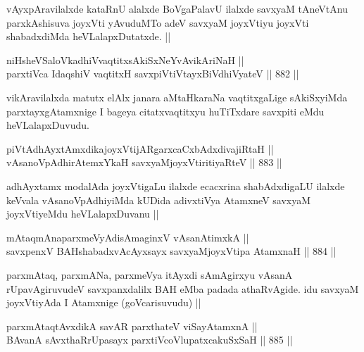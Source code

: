 \begin{artha}
vAyxpAravilalxde kataRnU alalxde BoVgaPalavU ilalxde savxyaM tAneVtAnu parxkAshisuva joyxVti yAvuduMTo adeV savxyaM joyxVtiyu joyxVti shabadxdiMda heVLalapxDutatxde. ||
\end{artha}


\begin{shl}
niHsheVSaloVkadhiVvaqtitxsAkiSxNeYvAvikAriNaH ||  \\
parxtiVca IdaqshiV vaqtitxH savxpiVtiVtayxBiVdhiVyateV ||  882 ||  
\end{shl}

\begin{artha}
vikAravilalxda matutx elAlx janara aMtaHkaraNa vaqtitxgaLige sAkiSxyiMda parxtayxgAtamxnige I bageya citatxvaqtitxyu huTiTxdare savxpiti eMdu heVLalapxDuvudu.
\end{artha}

\begin{shl}
piVtAdhAyxtAmxdikajoyxVtijARgarxcaCxbAdxdivajiRtaH || \\
vAsanoVpAdhirAtemxYkaH savxyaMjoyxVtiritiyaRteV ||  883 ||  
\end{shl}

\begin{artha}
adhAyxtamx modalAda joyxVtigaLu ilalxde ecacxrina shabAdxdigaLU ilalxde keVvala vAsanoVpAdhiyiMda kUDida adivxtiVya AtamxneV savxyaM joyxVtiyeMdu heVLalapxDuvanu ||
\end{artha}


\begin{shl}
mAtaqmAnaparxmeVyAdisAmaginxV vAsanAtimxkA || \\
savxpenxV BAHshabadxvAcAyx\s sayx savxyaMjoyxVtipa AtamxnaH ||  884 ||  
\end{shl}

\begin{artha}
parxmAtaq, parxmANa, parxmeVya itAyxdi sAmAgirxyu vAsanA rUpavAgiruvudeV savxpanxdalilx BAH eMba padada athaRvAgide. idu savxyaM joyxVtiyAda I Atamxnige (goVcarisuvudu) ||
\end{artha}


\begin{shl}
parxmAtaqtAvxdikA savAR parxthateV viSayAtamxnA || \\
BAvanA sAvxthaRrUpasayx parxtiVcoV\s lupatxcakuSxSaH ||  885 ||  
\end{shl}

